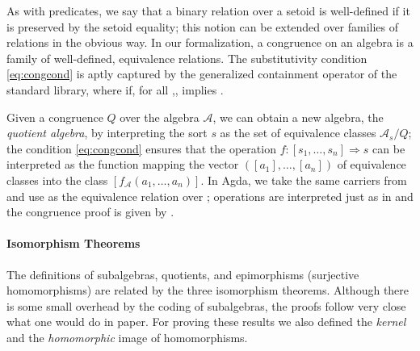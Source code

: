 As with predicates, we say that a binary relation over a setoid is
well-defined if it is preserved by the setoid equality; this notion
can be extended over families of relations in the obvious way. In our
formalization, a congruence on an algebra  is a family  of
well-defined, equivalence relations. The substitutivity condition
\eqref{eq:congcond} is aptly captured by the generalized containment
operator \AgdaUnderscore{}\AgdaOperator{\AgdaFunction{=[}}\AgdaUnderscore{}%
\AgdaOperator{\AgdaFunction{]⇒}}\AgdaUnderscore{} of the standard library, where \AgdaSpace{}\AgdaOperator{\AgdaFunction{=[}}\AgdaSpace{}%
\AgdaSpace{}\AgdaOperator{\AgdaFunction{]⇒}}\AgdaSpace{} if,
for all ,\AgdaSpace{}\AgdaSpace{}, \AgdaSymbol{(}\AgdaInductiveConstructor{,}\AgdaSymbol{)}\AgdaSpace{}\AgdaSpace{} implies \AgdaSymbol{(}\AgdaSpace{}\AgdaInductiveConstructor{,}\AgdaSpace{}\AgdaSpace{}\AgdaSymbol{)}\AgdaSpace{}\AgdaSpace{}.

Given a congruence $Q$ over the algebra $$, we can obtain a
new algebra, the \emph{quotient algebra}, by interpreting the sort $s$
as the set of equivalence classes $_s / Q$; the condition
\eqref{eq:congcond} ensures that the operation $ f : [s_1, \ldots,s_n]
\Rightarrow s$ can be interpreted as the function mapping the vector
$([a_1],\ldots,[a_n])$ of equivalence classes into the class $[
f_(a_1,\ldots,a_n)]$. In Agda, we take the same carriers
from  and use \AgdaSpace{} as the equivalence relation over
\AgdaSpace{}\AgdaSpace{}\AgdaSpace{}\AgdaSpace{}\AgdaSpace{}; operations are interpreted just as in  and the congruence proof
is given by \AgdaSpace{}.

\paragraph*{Isomorphism Theorems} The definitions of subalgebras,
quotients, and epimorphisms (surjective homomorphisms) are related by
the three isomorphism theorems. Although there is some small overhead
by the coding of subalgebras, the proofs follow very close what one would
do in paper. For proving these results we also defined the
\emph{kernel} and the \emph{homomorphic} image of homomorphisms.

